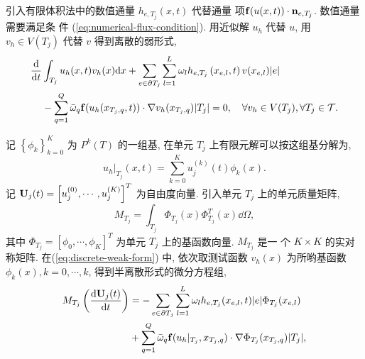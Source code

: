 引入有限体积法中的数值通量 $h_{e,T_{j}}(x,t)$ 代替通量
项${\bf{f}}(u(x,t))\cdot {\bf{n}}_{e,T_{j}}$. 数值通量需要满足条
件 (\ref{eq:numerical-flux-condition}). 用近似解 $u_{h}$ 代替
$u$, 用 $v_{h}\in V(T_{j})$ 代替 $v$ 得到离散的弱形式,
\begin{equation}
  \label{eq:discrete-weak-form}
  \begin{split}
    \frac{\mathrm{d}}{\mathrm{d} t}& \int_{T_{j}} u_{h}(x,t) v_{h}(x) \mathrm{d} x +
    \sum_{e\in\partial T_{j}} \sum_{l=1}^{L} \omega_{l} h_{e,T_{j}}
    \left( x_{e,l},t \right) v(x_{e,l}) \vert e \vert\\
    & - \sum_{q=1}^{Q} \bar{\omega}_{q} {\bf{f}}
    (u_{h}(x_{T_{j},q}, t)) \cdot \nabla v_{h} (x_{T_{j},q})
    \vert T_{j} \vert = 0, \quad \forall v_{h} \in V(T_{j}),
    \forall T_{j} \in \mathcal{T}.
  \end{split}
\end{equation}

记 $\left\{ \phi_{k} \right\}_{k=0}^{K}$ 为 $P^{k}(T)$ 的一组基,
在单元 $T_{j}$ 上有限元解可以按这组基分解为,
\begin{equation}
  \label{eq:decomposition-of-discontinuous-galerkin-solution}
  u_{h} |_{T_{j}} (x,t) = \sum_{k=0}^{K} u_{j}^{(k)} (t) \phi_{k} (x).
\end{equation}
记 ${\bf{U}}_{j}(t) = \left[ u_{j}^{(0)}, \cdots, u_{j}^{(K)}
\right]^{T}$ 为自由度向量. 引入单元 $T_{j}$ 上的单元质量矩阵,
\begin{equation}
  \label{eq:stiffness-matrix}
  M_{T_{j}} = \int_{T_{j}} {{\Phi}}_{T_{j}} (x)
  {{\Phi}}_{T_{j}}^{T} (x) \dd \Omega ,
\end{equation}
其中 $\Phi_{T_{j}} = \left[ \phi_{0}, \cdots, \phi_{K}
\right]^{T}$ 为单元 $T_{j}$ 上的基函数向量.  $M_{T_{j}}$ 是一
个 $K \times K$ 的实对称矩阵. 在(\ref{eq:discrete-weak-form}) 中,
依次取测试函数 $v_{h}(x)$ 为所哟基函数 $\phi_{k}(x), k = 0,
\cdots, k$, 得到半离散形式的微分方程组,
\begin{equation}
  \label{eq:semi-discrecte-ode}
  \begin{split}
    M_{T_{j}} \left( \frac{\mathrm{d} {\bf{U}}_{j}(t)}{\mathrm{d} t} \right) &=
    - \sum_{e \in \partial T_{j}} \sum_{l=1}^{L} \omega_{l}
    h_{e,T_{j}} (x_{e,l},t) \vert e \vert \Phi_{T_{j}}
    (x_{e,l})\\
    & + \sum_{q=1}^{Q} \bar{\omega}_{q}
    {\bf{f}}(u_{h}|_{T_{j}},x_{T_{j},q}) \cdot \nabla
    \Phi_{T_{j}} (x_{T_{j},q}) \vert T_{j} \vert,
  \end{split}
\end{equation}

